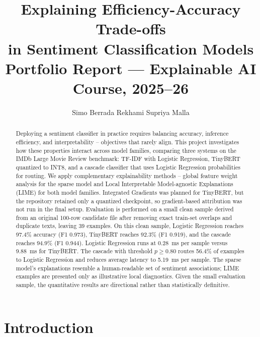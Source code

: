 \documentclass[10pt]{article}
\title{\textbf{Explaining Efficiency-Accuracy Trade-offs\\in Sentiment Classification Models}\\[0.4em]
{\large\normalfont Portfolio Report --- Explainable AI Course, 2025--26}}
\author{
  Simo Berrada Rekhami \quad Supriya Malla
}
\date{}
\begin{document}
\maketitle


\begin{abstract}

Deploying a sentiment classifier in practice requires balancing accuracy,
inference efficiency, and interpretability -- objectives that rarely align.
This project investigates how these properties interact across model families,
comparing three systems on the IMDb Large Movie Review benchmark: TF-IDF with
Logistic Regression, TinyBERT quantized to INT8, and a cascade classifier that
uses Logistic Regression probabilities for routing.  We apply complementary
explainability methods -- global feature weight analysis for the sparse model
and Local Interpretable Model-agnostic Explanations (LIME) for both model
families.  Integrated Gradients was planned for TinyBERT, but the repository
retained only a quantized checkpoint, so gradient-based attribution was not run
in the final setup.  Evaluation is performed on a small clean sample derived
from an original 100-row candidate file after removing exact train-set overlaps
and duplicate texts, leaving 39 examples.  On this clean sample, Logistic
Regression reaches 97.4\% accuracy (F1 0.973), TinyBERT reaches 92.3\%
(F1 0.919), and the cascade reaches 94.9\% (F1 0.944).  Logistic Regression
runs at 0.28~ms per sample versus 9.88~ms for TinyBERT.  The cascade with
threshold $p \geq 0.80$ routes 56.4\% of examples to Logistic Regression and
reduces average latency to 5.19~ms per sample.  The sparse model's explanations
resemble a
human-readable set of sentiment associations; LIME examples are presented only as
illustrative local diagnostics.  Given the small evaluation sample, the
quantitative results are directional rather than statistically definitive.

\end{abstract}


\section{Introduction}
\end{document}
